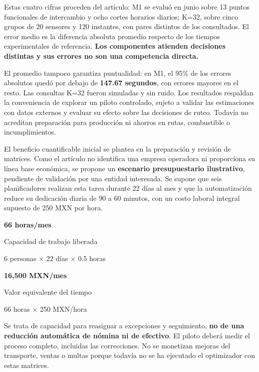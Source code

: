 \documentclass[letterpaper,11pt]{article}
\newcommand{\cifra}[3]{\begingroup\setlength{\fboxsep}{6pt}\colorbox{blue!7}{\parbox[t]{\dimexpr\linewidth-2\fboxsep\relax}{\setstretch{1}\textcolor{blue!55!black}{\Large\bfseries #1}\par\small #2\par\footnotesize #3}}\endgroup}
\newcommand{\encabezado}[1]{\par\medskip\noindent{\large\bfseries #1}\par\smallskip}
\begin{document}
Estas cuatro cifras proceden del artículo: M1 se evaluó en junio sobre 13 puntos funcionales de intercambio y ocho cortes horarios diarios; K=32, sobre cinco grupos de 20 sensores y 120 instantes, con pares distintos de los consultados. El error medio es la diferencia absoluta promedio respecto de los tiempos experimentales de referencia. \textbf{Los componentes atienden decisiones distintas y sus errores no son una competencia directa.}

El promedio tampoco garantiza puntualidad: en M1, el 95\% de los errores absolutos quedó por debajo de \textbf{147.67 segundos}, con errores mayores en el resto. Las consultas K=32 fueron simuladas y sin ruido. Los resultados respaldan la conveniencia de explorar un piloto controlado, sujeto a validar las estimaciones con datos externos y evaluar su efecto sobre las decisiones de ruteo. Todavía no acreditan preparación para producción ni ahorros en rutas, combustible o incumplimientos.

\newpage
\encabezado{Valor esperado e inversión por etapas}

El beneficio cuantificable inicial se plantea en la preparación y revisión de matrices. Como el artículo no identifica una empresa operadora ni proporciona su línea base económica, se propone un \textbf{escenario presupuestario ilustrativo}, pendiente de validación por una entidad interesada. Se supone que seis planificadores realizan esta tarea durante 22 días al mes y que la automatización reduce su dedicación diaria de 90 a 60 minutos, con un costo laboral integral supuesto de 250 MXN por hora.

\medskip\noindent
\begin{minipage}[t]{.485\linewidth}\cifra{66 horas/mes}{Capacidad de trabajo liberada}{6 personas $\times$ 22 días $\times$ 0.5 horas}\end{minipage}\hfill
\begin{minipage}[t]{.485\linewidth}\cifra{16,500 MXN/mes}{Valor equivalente del tiempo}{66 horas $\times$ 250 MXN/hora}\end{minipage}\par\smallskip
{}

Se trata de capacidad para reasignar a excepciones y seguimiento, \textbf{no de una reducción automática de nómina ni de efectivo}. El piloto deberá medir el proceso completo, incluidas las correcciones. No se monetizan mejoras del transporte, ventas o multas porque todavía no se ha ejecutado el optimizador con estas matrices.
\end{document}
